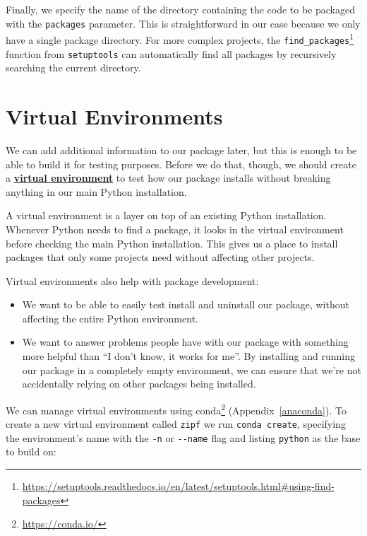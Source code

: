 \documentclass[
]{krantz}
\providecommand{\tightlist}{%
  \setlength{\itemsep}{0pt}\setlength{\parskip}{0pt}}
\renewcommand{\href}[2]{#2\footnote{\url{#1}}}
\newcommand{\gref}[2]{\hyperlink{#2}{\textbf{#1}}}
\begin{document}
Finally,
we specify the name of the directory
containing the code to be packaged with the \texttt{packages} parameter.
This is straightforward in our case because we only have a single package directory.
For more complex projects,
the \href{https://setuptools.readthedocs.io/en/latest/setuptools.html\#using-find-packages}{\texttt{find\_packages}} function from \texttt{setuptools}
can automatically find all packages by recursively searching the current directory.

\hypertarget{packaging-virtualenv}{%
\section{Virtual Environments}\label{packaging-virtualenv}}

We can add additional information to our package later,
but this is enough to be able to build it for testing purposes.
Before we do that,
though,
we should create a \gref{virtual environment}{virtual\_environment}
to test how our package installs
without breaking anything in our main Python installation.

A virtual environment is a layer on top of an existing Python installation.
Whenever Python needs to find a package,
it looks in the virtual environment before checking the main Python installation.
This gives us a place to install packages that only some projects need
without affecting other projects.

Virtual environments also help with package development:

\begin{itemize}
\tightlist
\item
  We want to be able to easily test install and uninstall our package,
  without affecting the entire Python environment.
\item
  We want to answer problems people have with our package with something more helpful than
  ``I don't know, it works for me''.
  By installing and running our package in a completely empty environment,
  we can ensure that we're not accidentally relying on other packages being installed.
\end{itemize}

We can manage virtual environments using \href{https://conda.io/}{conda} (Appendix~\ref{anaconda}).
To create a new virtual environment called \texttt{zipf} we run \texttt{conda\ create},
specifying the environment's name with the \texttt{-n} or \texttt{-\/-name} flag
and listing \texttt{python} as the base to build on:
\end{document}
